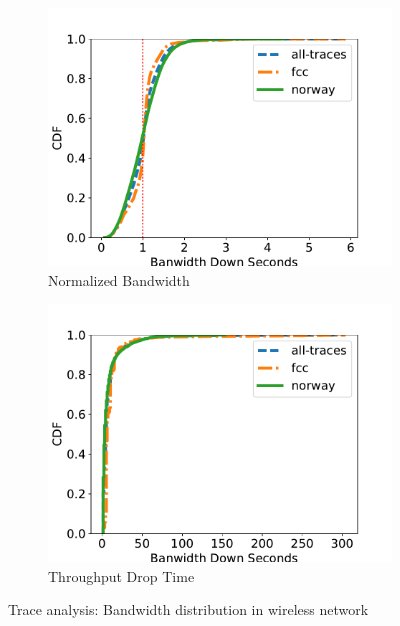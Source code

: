 \begin{figure}[htb]
\centering
\begin{subfigure}[b]{.45\columnwidth}
\centering
\includegraphics[width=\textwidth]{fig/trace.pdf}
\caption{Normalized Bandwidth}
\label{fig:trace}
\end{subfigure}
\begin{subfigure}[b]{.45\columnwidth}
\centering
\includegraphics[width=\textwidth]{fig/trace-down.pdf}
\caption{Throughput Drop Time}
\label{fig:trace-down}
\end{subfigure}
\caption{Trace analysis: Bandwidth distribution in wireless network}
\label{fig:trace-all}
\end{figure}
